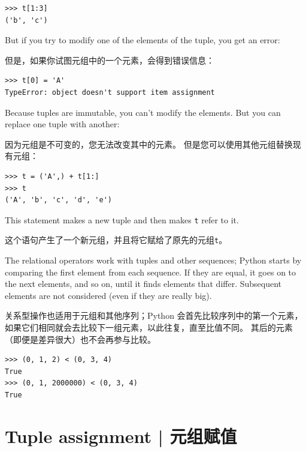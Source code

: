 \begin{lstlisting}
>>> t[1:3]
('b', 'c')
\end{lstlisting}
%
But if you try to modify one of the elements of the tuple, you get
an error:

但是，如果你试图元组中的一个元素，会得到错误信息：

  
  

\begin{lstlisting}
>>> t[0] = 'A'
TypeError: object doesn't support item assignment
\end{lstlisting}

%
Because tuples are immutable, you can't modify the elements.  But you
can replace one tuple with another:

因为元组是不可变的，您无法改变其中的元素。 但是您可以使用其他元组替换现有元组：

\begin{lstlisting}
>>> t = ('A',) + t[1:]
>>> t
('A', 'b', 'c', 'd', 'e')
\end{lstlisting}
%
This statement makes a new tuple and then makes {\tt t} refer to it.

这个语句产生了一个新元组，并且将它赋给了原先的元组\lstinline{t}。

The relational operators work with tuples and other sequences;
Python starts by comparing the first element from each
sequence.  If they are equal, it goes on to the next elements,
and so on, until it finds elements that differ.  Subsequent
elements are not considered (even if they are really big).

关系型操作也适用于元组和其他序列；Python 会首先比较序列中的第一个元素，如果它们相同就会去比较下一组元素，以此往复，直至比值不同。 其后的元素（即便是差异很大）也不会再参与比较。


\begin{lstlisting}
>>> (0, 1, 2) < (0, 3, 4)
True
>>> (0, 1, 2000000) < (0, 3, 4)
True
\end{lstlisting}


\section{Tuple assignment | 元组赋值}
\label{tuple.assignment}  
 

